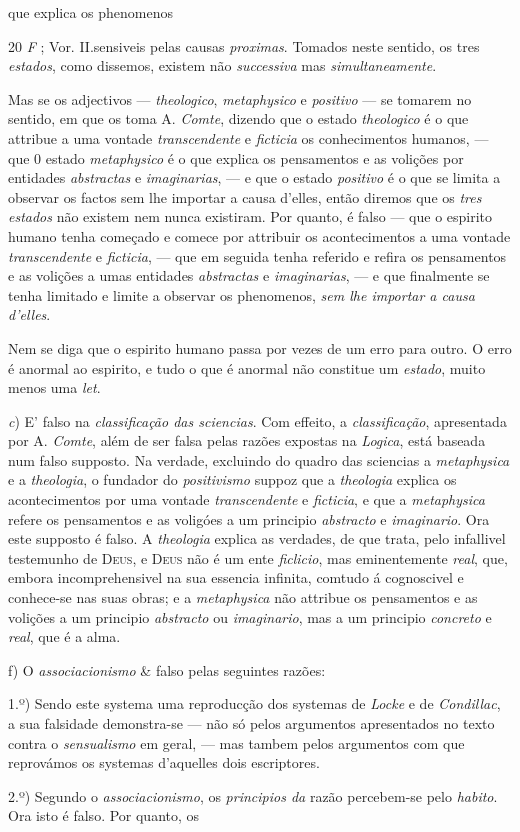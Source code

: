 que explica os phenomenos\par 20 \emph{F} ; Vor. II.sensiveis pelas causas \emph{proximas}. Tomados neste sentido, os tres \emph{estados}, como dissemos, existem não \emph{successiva} mas \emph{simultaneamente}.\par Mas se os adjectivos --- \emph{theologico}, \emph{metaphysico} e \emph{positivo} --- se tomarem no sentido, em que os toma A. \emph{Comte}, dizendo que o estado \emph{theologico} é o que attribue a uma vontade \emph{transcendente} e \emph{ficticia} os conhecimentos humanos, --- que 0 estado \emph{metaphysico} é o que explica os pensamentos e as volições por entidades \emph{abstractas} e \emph{imaginarias}, --- e que o estado \emph{positivo} é o que se limita a observar os factos sem lhe importar a causa d'elles, então diremos que os \emph{tres estados} não existem nem nunca existiram. Por quanto, é falso --- que o espirito humano tenha começado e comece por attribuir os acontecimentos a uma vontade \emph{transcendente} e \emph{ficticia}, --- que em seguida tenha referido e refira os pensamentos e as volições a umas entidades \emph{abstractas} e \emph{imaginarias}, --- e que finalmente se tenha limitado e limite a observar os phenomenos, \emph{sem lhe importar a causa d'elles}.\par Nem se diga que o espirito humano passa por vezes de um erro para outro. O erro é anormal ao espirito, e tudo o que é anormal não constitue um \emph{estado}, muito menos uma \emph{let}.\par \emph{c}) E' falso na \emph{classificação das sciencias}. Com effeito, a \emph{classificação}, apresentada por A. \emph{Comte}, além de ser falsa pelas razões expostas na \emph{Logica}, está baseada num falso supposto. Na verdade, excluindo do quadro das sciencias a \emph{metaphysica} e a \emph{theologia}, o fundador do \emph{positivismo} suppoz que a \emph{theologia} explica os acontecimentos por uma vontade \emph{transcendente} e \emph{ficticia}, e que a \emph{metaphysica} refere os pensamentos e as voligóes a um principio \emph{abstracto} e \emph{imaginario}. Ora este supposto é falso. A \emph{theologia} explica as verdades, de que trata, pelo infallivel testemunho de \textsc{Deus}, e \textsc{Deus} não é um ente \emph{ficlicio}, mas eminentemente \emph{real}, que, embora incomprehensivel na sua essencia infinita, comtudo á cognoscivel e conhece-se nas suas obras; e a \emph{metaphysica} não attribue os pensamentos e as volições a um principio \emph{abstracto} ou \emph{imaginario}, mas a um principio \emph{concreto} e \emph{real}, que é a alma.\par f) O \emph{associacionismo} \& falso pelas seguintes razões:\par 1.º) Sendo este systema uma reproducção dos systemas de \emph{Locke} e de \emph{Condillac}, a sua falsidade demonstra-se --- não só pelos argumentos apresentados no texto contra o \emph{sensualismo} em geral, --- mas tambem pelos argumentos com que reprovámos os systemas d'aquelles dois escriptores.\par 2.º) Segundo o \emph{associacionismo}, os \emph{principios da} razão percebem-se pelo \emph{habito}. Ora isto é falso. Por quanto, os 